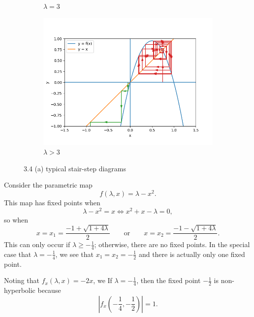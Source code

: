 \documentclass[nonumber]{homework}
\begin{document}
\begin{figure}[h]
\begin{subfigure}{.33\textwidth}
			\caption{$\lambda = 3$}
			\label{fig:3.4aeq3}
		\end{subfigure}
		\begin{subfigure}{.33\textwidth}
			\centering
			\includegraphics[width=\linewidth]{3.4a lambda gt 3.png}
			\caption{$\lambda > 3$}
			\label{fig:3.4agt3}
		\end{subfigure}
		\caption{3.4 (a) typical stair-step diagrams}
		\label{fig:3.4a}
	\end{figure}
	
	\newpage
	
	Consider the parametric map
	\begin{equation*}
		f(\lambda, x) = \lambda - x^2.
	\end{equation*}
	This map has fixed points when
	\begin{equation*}
		\lambda - x^2 = x \iff x^2 + x - \lambda = 0,
	\end{equation*}
	so when
	\begin{equation*}
		x = x_1 = \frac{-1 + \sqrt{1 + 4\lambda}}{2} \qquad\text{or}\qquad x = x_2 = \frac{-1-\sqrt{1+4\lambda}}{2}.
	\end{equation*}
	This can only occur if $\lambda \ge -\frac{1}{4}$; otherwise, there are no fixed points. In the special case that $\lambda = -\frac{1}{4}$, we see that $x_1 = x_2 = -\frac{1}{2}$ and there is actually only one fixed point.
	
	Noting that $f_x(\lambda, x) = -2x$, we If $\lambda = -\frac{1}{4}$, then the fixed point $-\frac{1}{2}$ is non-hyperbolic because
	\begin{equation*}
		\left|f_x\left(-\frac{1}{4}, -\frac{1}{2}\right)\right| = 1.
	\end{equation*}
	
\end{document}
